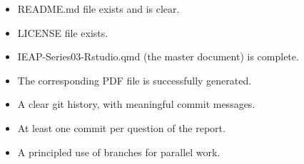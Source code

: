 \documentclass[
  letterpaper,
  DIV=11,
  numbers=noendperiod]{scrartcl}
\providecommand{\tightlist}{%
  \setlength{\itemsep}{0pt}\setlength{\parskip}{0pt}}
\begin{document}
\begin{itemize}
\tightlist
\item[$\boxtimes$]
  README.md file exists and is clear.
\item[$\boxtimes$]
  LICENSE file exists.
\item[$\boxtimes$]
  IEAP-Series03-Rstudio.qmd (the master document) is complete.
\item[$\boxtimes$]
  The corresponding PDF file is successfully generated.
\item[$\boxtimes$]
  A clear git history, with meaningful commit messages.
\item[$\boxtimes$]
  At least one commit per question of the report.
\item[$\boxtimes$]
  A principled use of branches for parallel work.
\end{itemize}
\end{document}
